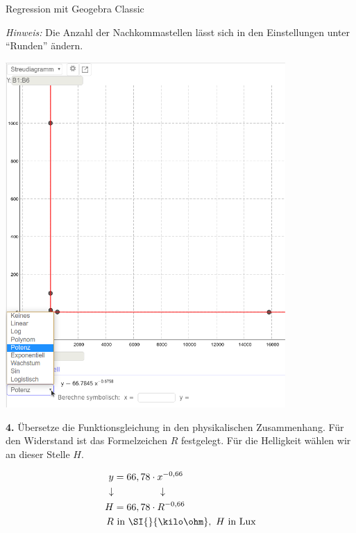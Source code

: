 \begin{zsfg}{Regression mit Geogebra Classic}
\begin{minipage}[c][7.5cm][t]{0.48\textwidth}
		\emph{Hinweis:} Die Anzahl der Nachkommastellen lässt sich in den Einstellungen unter \enquote{Runden} ändern.
	\end{minipage}
	\hfill
	\begin{minipage}[c][7.5cm][t]{0.48\textwidth}
		\centering
		\includegraphics[width=0.8\textwidth]{./pics/RegressionLDR-GGB-3.png}
	\end{minipage}
	
	\begin{minipage}[c][3cm][t]{0.48\textwidth}
		\textbf{4.} Übersetze die Funktionsgleichung in den physikalischen Zusammenhang. Für den Widerstand ist das Formelzeichen $R$ festgelegt. Für die Helligkeit wählen wir an dieser Stelle $H$.
	\end{minipage}
	\hfill
	\begin{minipage}[c][3cm][t]{0.48\textwidth}
		\centering
		\vspace{-\baselineskip}
		\begin{align*}
			y &= 66,78 \cdot x^{-0,66} \\
			\downarrow & \hspace{1.6cm}\downarrow \\
			H &= 66,78 \cdot R^{-0,66} \\
			R &\text{ in } \SI{}{\kilo\ohm}, ~ H \text{ in Lux} 
		\end{align*}
	\end{minipage}
\end{zsfg}
\vfill
	
